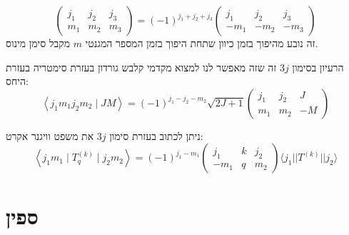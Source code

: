 \documentclass{tstextbook}
\begin{document}
\begin{proposition}
$$\begin{pmatrix}j_{1} & j_{2} & j_{3} \\m_{1} & m_{2} & m_{3}\end{pmatrix}= (-1)^{j_{1}+j_{2}+j_{3}}\begin{pmatrix}j_{1} & j_{2} & j_{3} \\-m_{1} & -m_{2} & -m_{3}
\end{pmatrix}$$
זה נובע מהיפוך בזמן כיוון שתחת היפוך בזמן המספר המגנטי \(m\) מקבל סימן מינוס.

\end{proposition}
הרעיון בסימון \(3j\) זה שזה מאפשר לנו למצוא מקדמי קלבש גורדון בעזרת סימטריה בעזרת היחס:
$$\left\langle  j_{1}m_{1}j_{2}m_{2} \mid JM \right\rangle=(-1)^{j_{1}-j_{2}-m_{2}}\sqrt{ 2J+1 }\begin{pmatrix}j_{1} & j_{2} & J \\m_{1} & m_{2} & -M
\end{pmatrix} $$

\begin{remark}
ניתן לכתוב בעזרת סימון \(3j\) את משפט וויגנר אקרט:
$$\left\langle  j_{1}m_{1}\mid T_{q}^{(k)}\mid j_{2}m_{2}  \right\rangle =(-1)^{j_{1}-m_{1}}\begin{pmatrix}j_{1} & k & j_{2} \\-m_{1} & q & m_{2} 
\end{pmatrix}\langle j_{1}|| T^{(k)}||j_{2} \rangle $$

\end{remark}
\section{ספין}
\end{document}
